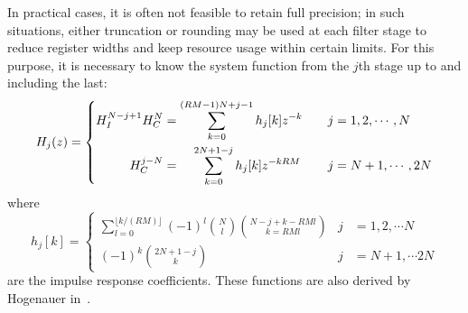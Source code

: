 In practical cases, it is often not feasible to retain full precision; in such
situations, either truncation or rounding may  be used at each filter stage to
reduce register widths and keep resource usage within certain limits. For this
purpose, it is necessary  to know the system function from  the $j$th stage up
to and including the last:
\begin{equation}
    \label{eq:cic:truncation_rounding:system_function}
    H_j(z) = \left\lbrace
        \begin{aligned}
            H_I^{N-j+1}H_C^N                        &
            = \sum_{k=0}^{(RM-1)N+j-1} h_j[k]z^{-k} &
            \quad j                                 &
            = 1, 2, \cdots, N                       \\
            H_C^{j-N}                                          &
            = \hspace{1.1em}\sum_{k=0}^{2N+1-j} h_j[k]z^{-kRM} &
            \quad j                                            &
            = N+1, \cdots, 2N
        \end{aligned}
    \right.
\end{equation}
where
\begin{equation}
    \label{eq:cic:truncation_rounding:system_function}
    h_j[k] = \left\lbrace
        \begin{aligned}
            \sum_{l=0}^{\lfloor k/(RM) \rfloor} (-1)^l
            {{N}\choose{l}}{{N-j+k-RMl}\choose{k = RMl}} &
            j                                            &
            = 1, 2, \cdots N                             \\
            (-1)^k{{2N+1-j}\choose{k}} &
            j                          &
            = N+1, \cdots 2N
        \end{aligned}
    \right.
\end{equation}
are the  impulse response  coefficients. These functions  are also  derived by
Hogenauer in~\cite{1163535}.

